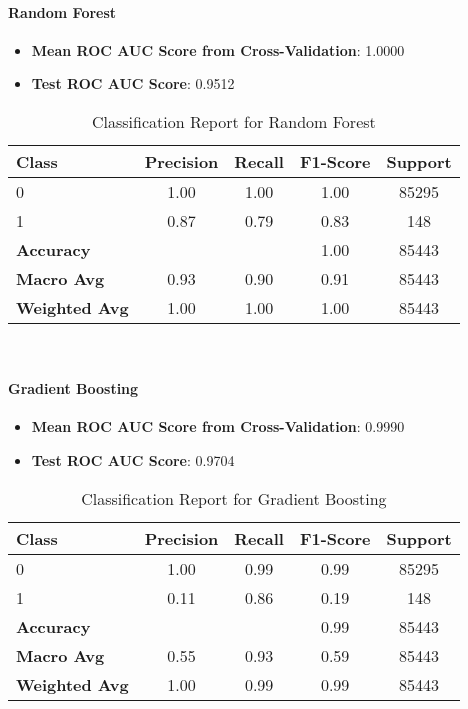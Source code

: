 \documentclass{article}
\begin{document}
\paragraph{Random Forest}
\begin{itemize}
    \item \textbf{Mean ROC AUC Score from Cross-Validation}: 1.0000
    \item \textbf{Test ROC AUC Score}: 0.9512
\end{itemize}

\begin{table}[h!]
\centering
\caption{Classification Report for Random Forest}
\begin{tabular}{lcccc}
\hline
\textbf{Class} & \textbf{Precision} & \textbf{Recall} & \textbf{F1-Score} & \textbf{Support} \\
\hline
0 & 1.00 & 1.00 & 1.00 & 85295 \\
1 & 0.87 & 0.79 & 0.83 & 148 \\
\hline
\textbf{Accuracy} & & & 1.00 & 85443 \\
\textbf{Macro Avg} & 0.93 & 0.90 & 0.91 & 85443 \\
\textbf{Weighted Avg} & 1.00 & 1.00 & 1.00 & 85443 \\
\hline
\end{tabular}
\end{table}

\

\paragraph{Gradient Boosting}
\begin{itemize}
    \item \textbf{Mean ROC AUC Score from Cross-Validation}: 0.9990
    \item \textbf{Test ROC AUC Score}: 0.9704
\end{itemize}

\begin{table}[h!]
\centering
\caption{Classification Report for Gradient Boosting}
\begin{tabular}{lcccc}
\hline
\textbf{Class} & \textbf{Precision} & \textbf{Recall} & \textbf{F1-Score} & \textbf{Support} \\
\hline
0 & 1.00 & 0.99 & 0.99 & 85295 \\
1 & 0.11 & 0.86 & 0.19 & 148 \\
\hline
\textbf{Accuracy} & & & 0.99 & 85443 \\
\textbf{Macro Avg} & 0.55 & 0.93 & 0.59 & 85443 \\
\textbf{Weighted Avg} & 1.00 & 0.99 & 0.99 & 85443 \\
\hline
\end{tabular}
\end{table}
\end{document}
